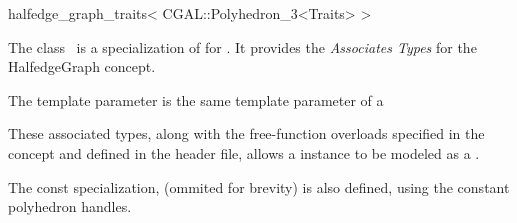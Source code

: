 

\begin{ccRefClass}{halfedge_graph_traits< CGAL::Polyhedron_3<Traits> >}


\ccDefinition

The class \ccRefName\ is a specialization of 
for . It provides the {\em Associates Types} 
for the {HalfedgeGraph} concept.

The template parameter  is the same  template parameter 
of a 


These associated types, along with the free-function overloads specified in the concept and defined in the header file, allows a  instance to be modeled as a .

\ccTypes

The const specialization,  
(ommited for brevity) is also defined, using the constant polyhedron handles.

\ccSeeAlso

\end{ccRefClass}


